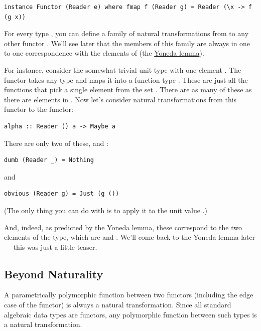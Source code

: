 \begin{verbatim}
instance Functor (Reader e) where fmap f (Reader g) = Reader (\x -> f (g x))
\end{verbatim}

For every type , you can define a family of natural
transformations from  to any other functor .
We'll see later that the members of this family are always in one to one
correspondence with the elements of  (the
\href{https://bartoszmilewski.com/2015/09/01/the-yoneda-lemma/}{Yoneda
lemma}).

For instance, consider the somewhat trivial unit type \code{()} with
one element \code{()}. The functor  takes any type
 and maps it into a function type .
These are just all the functions that pick a single element from the set
. There are as many of these as there are elements in
. Now let's consider natural transformations from this functor
to the  functor:

\begin{verbatim}
alpha :: Reader () a -> Maybe a
\end{verbatim}

There are only two of these,  and :

\begin{verbatim}
dumb (Reader _) = Nothing
\end{verbatim}

and

\begin{verbatim}
obvious (Reader g) = Just (g ())
\end{verbatim}

(The only thing you can do with  is to apply it to the unit
value \code{()}.)

And, indeed, as predicted by the Yoneda lemma, these correspond to the
two elements of the  type, which are 
and . We'll come back to the Yoneda lemma later ---
this was just a little teaser.

\subsection{Beyond Naturality}\label{beyond-naturality}

A parametrically polymorphic function between two functors (including
the edge case of the  functor) is always a natural
transformation. Since all standard algebraic data types are functors,
any polymorphic function between such types is a natural transformation.

